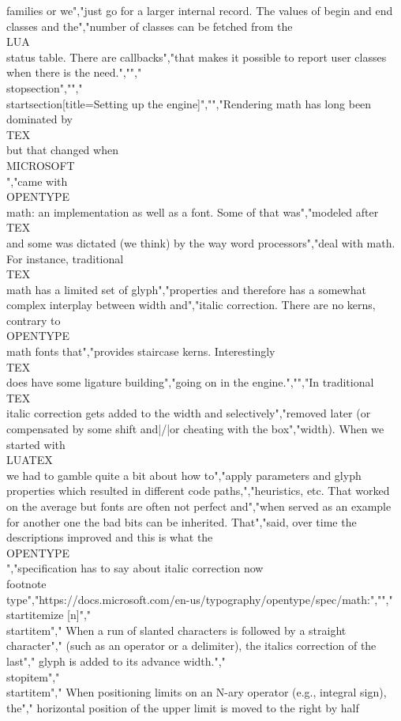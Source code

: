 families or we","just go for a larger internal record. The values of begin and end classes and the","number of classes can be fetched from the \\LUA\\ status table. There are callbacks","that makes it possible to report user classes when there is the need.","","\\stopsection","","\\startsection[title=Setting up the engine]","","Rendering math has long been dominated by \\TEX\\ but that changed when \\MICROSOFT\\","came with \\OPENTYPE\\ math: an implementation as well as a font. Some of that was","modeled after \\TEX\\ and some was dictated (we think) by the way word processors","deal with math. For instance, traditional \\TEX\\ math has a limited set of glyph","properties and therefore has a somewhat complex interplay between width and","italic correction. There are no kerns, contrary to \\OPENTYPE\\ math fonts that","provides staircase kerns. Interestingly \\TEX\\ does have some ligature building","going on in the engine.","","In traditional \\TEX\\ italic correction gets added to the width and selectively","removed later (or compensated by some shift and|/|or cheating with the box","width). When we started with \\LUATEX\\ we had to gamble quite a bit about how to","apply parameters and glyph properties which resulted in different code paths,","heuristics, etc. That worked on the average but fonts are often not perfect and","when served as an example for another one the bad bits can be inherited. That","said, over time the descriptions improved and this is what the \\OPENTYPE\\","specification has to say about italic correction now \\footnote {\\type","{https://docs.microsoft.com/en-us/typography/opentype/spec/math}}:","","\\startitemize [n]","    \\startitem","        When a run of slanted characters is followed by a straight character","        (such as an operator or a delimiter), the italics correction of the last","        glyph is added to its advance width.","    \\stopitem","    \\startitem","        When positioning limits on an N-ary operator (e.g., integral sign), the","        horizontal position of the upper limit is moved to the right by half 